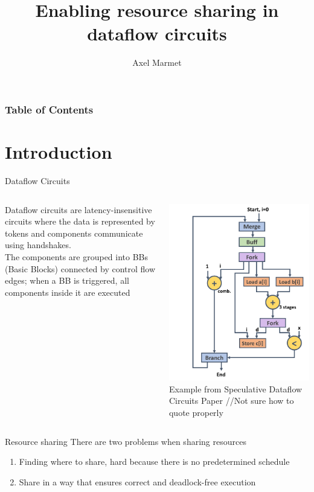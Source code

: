 \documentclass{beamer}
\title[Resource Sharing] %
{Enabling resource sharing in dataflow circuits}
\author[Marmet] %
{Axel Marmet}
\institute[EPFL] %
\date[2020] %
\begin{document}
\frame{\titlepage}


\begin{frame}
\frametitle{Table of Contents}
\tableofcontents
\end{frame}

\section{Introduction}
\begin{frame}{Dataflow Circuits}
    \begin{columns}[T]
    \begin{column}{0.45\textwidth}
        Dataflow circuits are latency-insensitive circuits where the data is represented by tokens and components communicate using handshakes. \\
       The components are grouped into BBs (Basic Blocks) connected by control flow edges; when a BB is triggered, all components inside it are executed
    \end{column}
    \begin{column}{0.45\textwidth}
        \begin{center}
      \includegraphics[scale=0.4]{dataflow_example.png}
      Example from Speculative Dataflow Circuits Paper //Not sure how to quote properly
    \end{center}
    \end{column}
  \end{columns}
\end{frame}
\begin{frame}{Resource sharing}
    There are two problems when sharing resources
    \begin{enumerate}
        \item Finding where to share, hard because there is no predetermined schedule
        \item Share in a way that ensures correct and deadlock-free execution
    \end{enumerate}
\end{frame}
\end{document}
